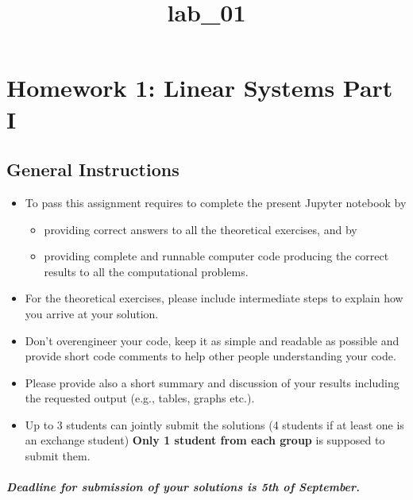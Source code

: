\documentclass[11pt]{article}
\title{lab\_01}
\providecommand{\tightlist}{%
      \setlength{\itemsep}{0pt}\setlength{\parskip}{0pt}}
\begin{document}
    
    
    \maketitle
    
    

    
    \section{Homework 1: Linear Systems Part
I}\label{homework-1-linear-systems-part-i}

    \subsection{General Instructions}\label{general-instructions}

\begin{itemize}
\item
  To pass this assignment requires to complete the present Jupyter
  notebook by

  \begin{itemize}
  \tightlist
  \item
    providing correct answers to all the theoretical exercises, and by
  \item
    providing complete and runnable computer code producing the correct
    results to all the computational problems.
  \end{itemize}
\item
  For the theoretical exercises, please include intermediate steps to
  explain how you arrive at your solution.
\item
  Don't overengineer your code, keep it as simple and readable as
  possible and provide short code comments to help other people
  understanding your code.
\item
  Please provide also a short summary and discussion of your results
  including the requested output (e.g., tables, graphs etc.).
\item
  Up to 3 students can jointly submit the solutions (4 students if at
  least one is an exchange student) \textbf{Only 1 student from each
  group} is supposed to submit them.
\end{itemize}

\subparagraph{\texorpdfstring{Deadline for submission of your solutions
is \textbf{5th of
September}.}{Deadline for submission of your solutions is 5th of September.}}\label{deadline-for-submission-of-your-solutions-is-5th-of-september.}
\end{document}

